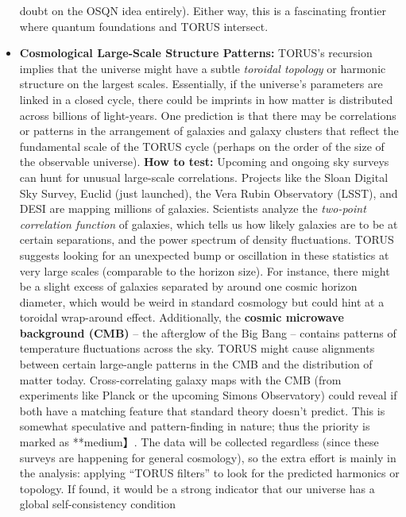 \documentclass[
]{article}
\begin{document}
\begin{itemize}
  doubt on the OSQN idea entirely). Either way, this is a fascinating
  frontier where quantum foundations and TORUS intersect.
\item
  \textbf{Cosmological Large-Scale Structure Patterns:} TORUS's
  recursion implies that the universe might have a subtle \emph{toroidal
  topology} or harmonic structure on the largest scales. Essentially, if
  the universe's parameters are linked in a closed cycle, there could be
  imprints in how matter is distributed across billions of light-years.
  One prediction is that there may be correlations or patterns in the
  arrangement of galaxies and galaxy clusters that reflect the
  fundamental scale of the TORUS cycle (perhaps on the order of the size
  of the observable universe). \textbf{How to test:} Upcoming and
  ongoing sky surveys can hunt for unusual large-scale correlations.
  Projects like the Sloan Digital Sky Survey, Euclid (just launched),
  the Vera Rubin Observatory (LSST), and DESI are mapping millions of
  galaxies. Scientists analyze the \emph{two-point correlation function}
  of galaxies, which tells us how likely galaxies are to be at certain
  separations, and the power spectrum of density fluctuations. TORUS
  suggests looking for an unexpected bump or oscillation in these
  statistics at very large scales (comparable to the horizon
  size)\hspace{0pt}. For instance, there might be a slight excess of
  galaxies separated by around one cosmic horizon diameter, which would
  be weird in standard cosmology but could hint at a toroidal
  wrap-around effect. Additionally, the \textbf{cosmic microwave
  background (CMB)} -- the afterglow of the Big Bang -- contains
  patterns of temperature fluctuations across the sky. TORUS might cause
  alignments between certain large-angle patterns in the CMB and the
  distribution of matter today\hspace{0pt}. Cross-correlating galaxy
  maps with the CMB (from experiments like Planck or the upcoming Simons
  Observatory) could reveal if both have a matching feature that
  standard theory doesn't predict\hspace{0pt}. This is somewhat
  speculative and pattern-finding in nature; thus the priority is marked
  as **medium】. The data will be collected regardless (since these
  surveys are happening for general cosmology), so the extra effort is
  mainly in the analysis: applying ``TORUS filters'' to look for the
  predicted harmonics or topology. If found, it would be a strong
  indicator that our universe has a global self-consistency condition

\end{itemize}
\end{document}
